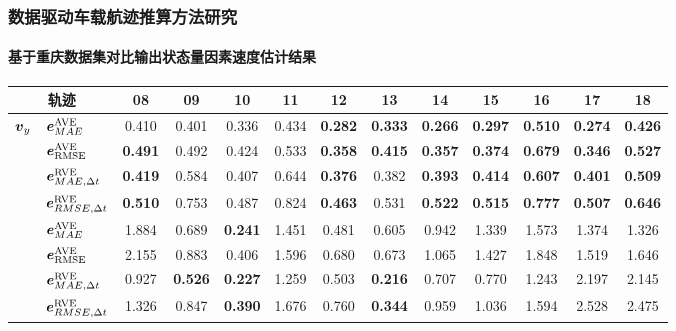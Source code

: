 \begin{frame} 
 	\frametitle{数据驱动车载航迹推算方法研究}
 	\framesubtitle{基于重庆数据集对比输出状态量因素速度估计结果}
    {\small
    \setlength{\tabcolsep}{2pt}
		\begin{tabular*}{\linewidth}{@{\extracolsep{\fill}}clccccccccccc}
			\toprule
			\multicolumn{2}{c}{轨迹} & 08 & 09 & 10 & 11 & 12 & 13 & 14 & 15 & 16 & 17 & 18 \\
			\midrule
			\multirow{4}{*}{$\vb*{v}_y$} 
			& $\vb*{e}^{\mathrm{AVE}}_{MAE}$ 
			& 0.410 & 0.401 & 0.336 & 0.434 & \textbf{0.282} & \textbf{0.333} & \textbf{0.266} & \textbf{0.297} & \textbf{0.510} & \textbf{0.274} & \textbf{0.426} \\         
			& $\vb*{e}^{\mathrm{AVE}}_{\mathrm{RMSE}}$          
			& \textbf{0.491} & 0.492 & 0.424 & 0.533 & \textbf{0.358} & \textbf{0.415} & \textbf{0.357} & \textbf{0.374} & \textbf{0.679} & \textbf{0.346} & \textbf{0.527} \\ 
			& $\vb*{e}^{\mathrm{RVE}}_{MAE, \Delta t}$ 
			& \textbf{0.419} & 0.584 & 0.407 & 0.644 & \textbf{0.376} & 0.382 & \textbf{0.393} & \textbf{0.414} & \textbf{0.607} & \textbf{0.401} & \textbf{0.509} \\
			& $\vb*{e}^{\mathrm{RVE}}_{RMSE,\Delta t}$ 
			& \textbf{0.510} & 0.753 & 0.487 & 0.824 & \textbf{0.463} & 0.531 & \textbf{0.522} & \textbf{0.515} & \textbf{0.777} & \textbf{0.507} & \textbf{0.646} \\ \addlinespace[1mm]
			\multirow{4}{*}{$\Delta\vb*{v}_y$} 
			& $\vb*{e}^{\mathrm{AVE}}_{MAE}$ 
			& 1.884 & 0.689 & \textbf{0.241} & 1.451 & 0.481 & 0.605 & 0.942 & 1.339 & 1.573 & 1.374 & 1.326 \\         
			& $\vb*{e}^{\mathrm{AVE}}_{\mathrm{RMSE}}$         
			& 2.155 & 0.883 & 0.406 & 1.596 & 0.680 & 0.673 & 1.065 & 1.427 & 1.848 & 1.519 & 1.646 \\
			& $\vb*{e}^{\mathrm{RVE}}_{MAE, \Delta t}$ 
			& 0.927 & \textbf{0.526} & \textbf{0.227} & 1.259 & 0.503 & \textbf{0.216} & 0.707 & 0.770 & 1.243 & 2.197 & 2.145 \\
			& $\vb*{e}^{\mathrm{RVE}}_{RMSE,\Delta t}$ 
			& 1.326 & 0.847 & \textbf{0.390} & 1.676 & 0.760 & \textbf{0.344} & 0.959 & 1.036 & 1.594 & 2.528 & 2.475 \\
			\bottomrule 
		\end{tabular*}
	}	
\end{frame}

